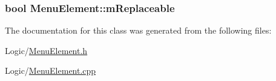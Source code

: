 \subsubsection[{\texorpdfstring{m\+Replaceable}{mReplaceable}}]{\setlength{\rightskip}{0pt plus 5cm}bool Menu\+Element\+::m\+Replaceable\hspace{0.3cm}{\ttfamily [protected]}}\hypertarget{classMenuElement_aa7757133db57bcc40c04d80278aa6b43}{}\label{classMenuElement_aa7757133db57bcc40c04d80278aa6b43}


The documentation for this class was generated from the following files\+:\begin{DoxyCompactItemize}
\item 
Logic/\hyperlink{MenuElement_8h}{Menu\+Element.\+h}\item 
Logic/\hyperlink{MenuElement_8cpp}{Menu\+Element.\+cpp}\end{DoxyCompactItemize}

